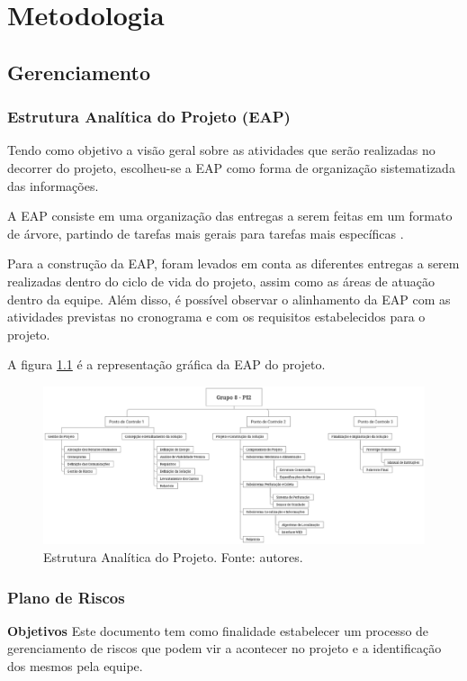 \chapter{Metodologia}
  \section{Gerenciamento}
    \subsection{Estrutura Analítica do Projeto (EAP)}

      Tendo como objetivo a visão geral sobre as atividades que serão
      realizadas no decorrer do projeto, escolheu-se a EAP como forma
      de organização sistematizada das informações.

      A EAP consiste em uma organização das entregas
      a serem feitas em um formato de árvore, partindo de tarefas
      mais gerais para tarefas mais específicas \cite{pmbok2012}.

      Para a construção da EAP, foram levados em conta as diferentes
      entregas a serem realizadas dentro do ciclo de vida do projeto,
      assim como as áreas de atuação dentro da equipe. Além disso, é
      possível observar o alinhamento da EAP com as atividades previstas
      no cronograma e com os requisitos estabelecidos para o projeto.

      A figura \ref{fig:eap} é a representação gráfica da EAP do projeto.

      \begin{figure}[!htbp]
        \centering
        \includegraphics[width=\textwidth]{figuras/EAP.eps}
        \caption{Estrutura Analítica do Projeto. Fonte: autores.}
        \label{fig:eap}
      \end{figure}

      \vfill
      \pagebreak

	\subsection{Plano de Riscos}
	\textbf{Objetivos}
		Este documento tem como finalidade estabelecer um processo de gerenciamento de riscos que podem vir a acontecer no projeto e a identificação dos mesmos pela equipe.
		
